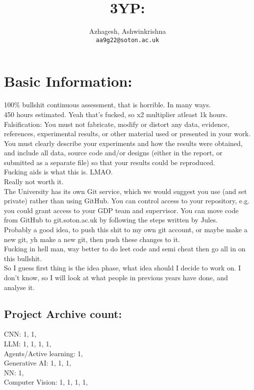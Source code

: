 \documentclass [12pt]{article}
\title{3YP:}
\author{
	Azhagesh, Ashwinkrishna\\
	\texttt{aa9g22@soton.ac.uk}
}
\begin{document}
\section{Basic Information:}

100\% bullshit continuous assessment, that is horrible. In many ways.\\ 

450 hours estimated. Yeah that's fucked, so x2 multiplier atleast 1k hours.\\ 

Falsification: You must not fabricate, modify or distort any data, evidence, references, experimental results, or other material used or presented in your work. You must clearly describe your experiments and how the results were obtained, and include all data, source code and/or designs (either in the report, or submitted as a separate file) so that your results could be reproduced. \\

Fucking aids is what this is. LMAO.\\ 
Really not worth it.\\ 

The University has its own Git service, which we would suggest you use (and set private) rather than using GitHub. You can control access to your repository, e.g. you could grant access to your GDP team and supervisor. You can move code from GitHub to git.soton.ac.uk by following the steps written by Jules. \\

Probably a good idea, to push this shit to my own git account, or maybe make a new git, yh make a new git, then push these changes to it. \\


Fucking in hell man, way better to do leet code and semi cheat then go all in on this bullshit.\\ 

So I guess first thing is the idea phase, what idea should I decide to work on. I don't know, so I will look at what people in previous years have done, and analyse it. \\ 


\subsection{Project Archive count: }

  
  CNN: 1, 1,\\ 
  LLM: 1, 1, 1, 1, \\
  Agents/Active learning: 1,\\ 
  Generative AI: 1, 1, 1, \\
  NN: 1, \\
  Computer Vision: 1, 1, 1, 1, \\
\end{document}
